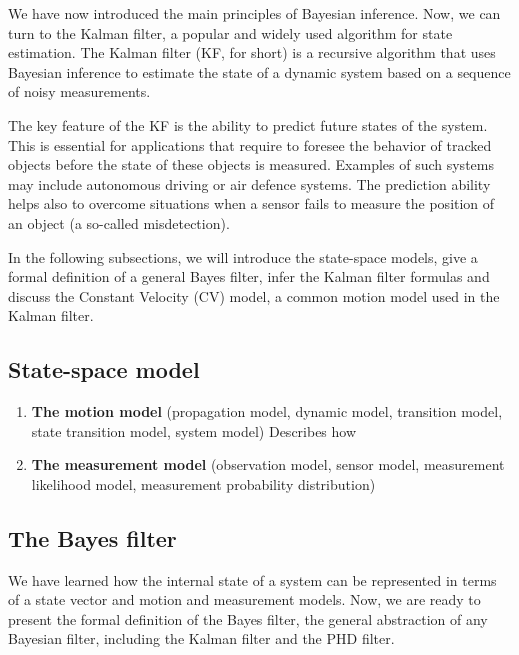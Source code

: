 
We have now introduced the main principles of Bayesian inference. Now, we can
turn to the Kalman filter, a popular and widely used algorithm for state 
estimation. The Kalman filter (KF, for short) is a recursive algorithm that uses
Bayesian inference to estimate the state of a dynamic system based on a sequence
of noisy measurements.

The key feature of the KF is the ability to predict future states of the system.
This is essential for applications that require to foresee the behavior of
tracked objects before the state of these objects is measured. Examples of such
systems may include autonomous driving or air defence systems. The prediction 
ability helps also to overcome situations when a sensor fails to measure the
position of an object (a so-called misdetection).

In the following subsections, we will introduce the state-space models, give
a formal definition of a general Bayes filter, infer the Kalman filter formulas
and discuss the Constant Velocity (CV) model, a common motion model used in the
Kalman filter.

\subsection{State-space model}


\begin{enumerate}
    \item \textbf{The motion model} (propagation model, dynamic model, transition model, state transition model, system model) Describes how 
    \item \textbf{The measurement model} (observation model, sensor model, measurement likelihood model, measurement probability distribution)
\end{enumerate}

\subsection{The Bayes filter}

We have learned how the internal state of a system can be represented in terms
of a state vector and motion and measurement models. Now, we are ready to 
present the formal definition of the Bayes filter, the general abstraction of
any Bayesian filter, including the Kalman filter and the PHD filter.

